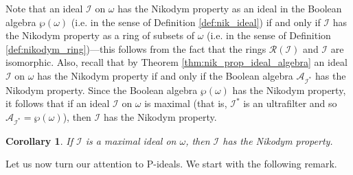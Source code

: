 \documentclass[a4paper,11pt,fleqn]{amsart}
\newtheorem{proposition}[theorem]{Proposition}
\newtheorem{corollary}[theorem]{Corollary}
\theoremstyle{definition}
\theoremstyle{remark}
\numberwithin{equation}{section}
\newcommand{\N}{\mathbb{N}}
\newcommand{\aA}{\mathcal{A}}
\newcommand{\iI}{\mathcal{I}}
\newcommand{\jJ}{\mathcal{J}}
\newcommand{\rR}{\mathcal{R}}
\newcommand{\sub}{\subseteq}
\newcommand{\seqn}[1]{\big\langle#1\colon\ n\io\big\rangle}
\newcommand{\io}{\in\omega}%
\newcommand{\wo}{{\wp(\omega)}}%
\begin{document}
%
%    

Note that an ideal $\iI$ on $\omega$ has the Nikodym property as an ideal in the Boolean algebra $\wo$ (i.e. in the sense of Definition \ref{def:nik_ideal}) if and only if $\iI$ has the Nikodym property as a ring of subsets of $\omega$ (i.e. in the sense of Definition \ref{def:nikodym_ring})---this follows from the fact that the rings $\rR(\iI)$ and $\iI$ are isomorphic. Also, recall that by Theorem \ref{thm:nik_prop_ideal_algebra} an ideal $\iI$ on $\omega$ has the Nikodym property if and only if the Boolean algebra $\aA_{\iI^*}$ has the Nikodym property. Since the Boolean algebra $\wo$ has the Nikodym property, it follows that if an ideal $\iI$ on $\omega$ is maximal (that is, $\iI^*$ is an ultrafilter and so $\aA_{\iI^*}=\wo$), then $\iI$ has the Nikodym property.

\begin{corollary}\label{cor:maximal_ideal_nik}
    If $\iI$ is a maximal ideal on $\omega$, then $\iI$ has the Nikodym property.
\end{corollary}

Let us now turn our attention to P-ideals. We start with the following remark.
\end{document}
